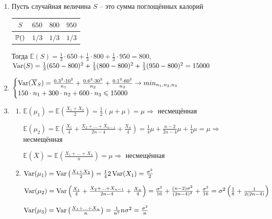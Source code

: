 \documentclass[12pt, a4paper]{article}\usepackage[]{graphicx}\usepackage[]{color}
\begin{document}
				\begin{enumerate}
					\item Пусть случайная величина $S$ – это сумма поглощённых калорий

					\begin{tabular}{c|ccc}
						$S$ & $650$ & $800$ & $950$ \\
						\hline
						$\P()$ & $1/3$ & $1/3$ & $1/3$ \\
					\end{tabular}

					Тогда $\mathbb{E}(S) = \frac{1}{3}\cdot 650 +  \frac{1}{3}\cdot 800 +  \frac{1}{3}\cdot 950 = 800$, $\Var(S) = \frac{1}{3}(650-800)^2 + \frac{1}{3}(800-800)^2 + \frac{1}{3}(950-800)^2 = 15000$

					\item
					$
					\begin{cases}
					\Var(\overline{X}_S) = \frac{0.3^2\cdot 10^2}{n_1} + \frac{0.6^2 \cdot 30^2}{n_2} + \frac{0.1^2 \cdot 60^2}{n_3} \to min_{n_1, n_2, n_3} \\
					150\cdot n_1 + 300 \cdot n_2 + 600 \cdot n_3 \leq 15000
					\end{cases}
					$

					\item
					\begin{enumerate}
						\item $\mathbb{E}(\mu_1) = \mathbb{E}\left(\frac{X_1+X_2}{2}\right)  = \frac{1}{2}(\mu+\mu) = \mu \Rightarrow$  несмещённая

						$\mathbb{E}(\mu_2) = \mathbb{E} \left(\frac{X_1}{4} + \frac{X_2+...+X_{n-1}}{2n-4} + \frac{X_n}{4}\right) = \frac{1}{4}\mu + \frac{n-2}{2n-4}\mu + \frac{1}{4}\mu = \mu \Rightarrow$ несмещённая

						$\mathbb{E}(\overline{X}) = \mathbb{E}\left(\frac{X_1 + ... + X_n}{n}\right) = \mu \Rightarrow$ несмещённая

						\item $\Var(\mu_1) = \Var\left(\frac{X_1+X_2}{2}\right)  = \frac{1}{4}2\Var(X_1) = \frac{\sigma^2}{2}$

						$\Var(\mu_2) = \Var \left(\frac{X_1}{4} + \frac{X_2+...+X_{n-1}}{2n-4} + \frac{X_n}{4}\right)  = \frac{\sigma^2}{16} + \frac{(n-2)\sigma^2}{(2n-4)^2} + \frac{\sigma^2}{16} = \sigma^2\left(\frac{1}{8} + \frac{1}{2(2n-4)} \right)$

						$\Var(\mu_3) = \Var\left(\frac{X_1 + ... + X_n}{n}\right)  = \frac{1}{n^2}n\sigma^2 = \frac{\sigma^2}{n}$
					\end{enumerate}


\end{enumerate}
\end{document}
